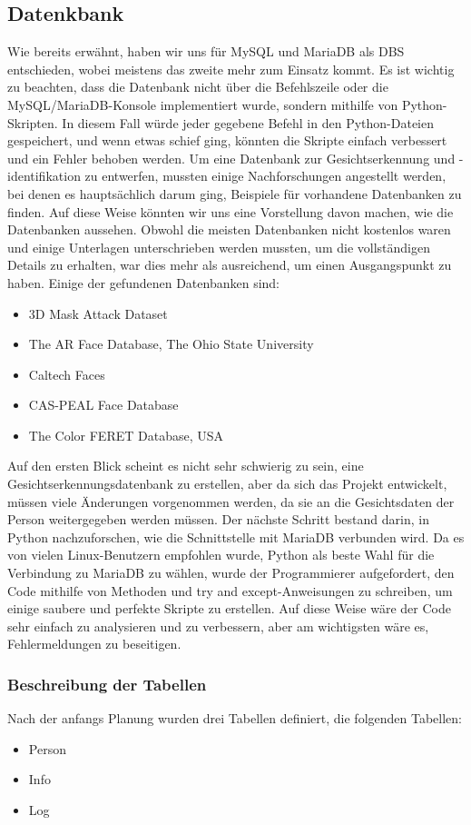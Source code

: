 \subsection{Datenkbank}
Wie bereits erwähnt, haben wir uns für MySQL und MariaDB als DBS entschieden, wobei meistens das zweite mehr zum Einsatz kommt. Es ist wichtig zu beachten, dass die Datenbank nicht über die Befehlszeile oder die MySQL/MariaDB-Konsole implementiert wurde, sondern mithilfe von Python-Skripten. In diesem Fall würde jeder gegebene Befehl in den Python-Dateien gespeichert, und wenn etwas schief ging, könnten die Skripte einfach verbessert und ein Fehler behoben werden.
\bigbreak
Um eine Datenbank zur Gesichtserkennung und -identifikation zu entwerfen, mussten einige Nachforschungen angestellt werden, bei denen es hauptsächlich darum ging, Beispiele für vorhandene Datenbanken zu finden. Auf diese Weise könnten wir uns eine Vorstellung davon machen, wie die Datenbanken aussehen. Obwohl die meisten Datenbanken nicht kostenlos waren und einige Unterlagen unterschrieben werden mussten, um die vollständigen Details zu erhalten, war dies mehr als ausreichend, um einen Ausgangspunkt zu haben. Einige der gefundenen Datenbanken sind:
\begin{itemize}
	\item 3D Mask Attack Dataset
	\item The AR Face Database, The Ohio State University
	\item Caltech Faces
	\item CAS-PEAL Face Database
	\item The Color FERET Database, USA
\end{itemize}
Auf den ersten Blick scheint es nicht sehr schwierig zu sein, eine Gesichtserkennungsdatenbank zu erstellen, aber da sich das Projekt entwickelt, müssen viele Änderungen vorgenommen werden, da sie an die Gesichtsdaten der Person weitergegeben werden müssen.
\bigbreak
Der nächste Schritt bestand darin, in Python nachzuforschen, wie die Schnittstelle mit MariaDB verbunden wird. Da es von vielen Linux-Benutzern empfohlen wurde, Python als beste Wahl für die Verbindung zu MariaDB zu wählen, wurde der Programmierer aufgefordert, den Code mithilfe von Methoden und try and except-Anweisungen zu schreiben, um einige saubere und perfekte Skripte zu erstellen. Auf diese Weise wäre der Code sehr einfach zu analysieren und zu verbessern, aber am wichtigsten wäre es, Fehlermeldungen zu beseitigen.
\subsubsection{Beschreibung der Tabellen}
Nach der anfangs Planung wurden drei Tabellen definiert, die folgenden Tabellen:
\begin{itemize}
	\item Person
	\item Info
	\item Log
\end{itemize}
